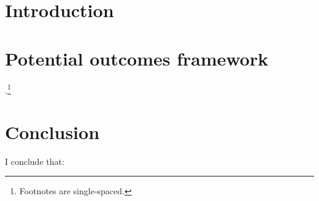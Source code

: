 \section{Introduction}
\blindmathtrue\blindtext

\section{Potential outcomes framework}
\label{sec:potent-outc-fram}
\blindmathtrue\blindtext.\footnote{Footnotes are single-spaced. \blindtext}

\section{Conclusion}
I conclude that:
\blinditemize
